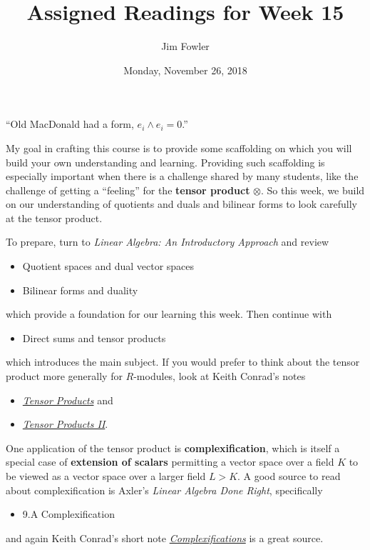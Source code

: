 \documentclass{homework}
\author{Jim Fowler}
\title{Assigned Readings for Week 15}
\date{Monday, November 26, 2018}
\begin{document}
\maketitle

``Old MacDonald had a form, $e_i \wedge e_i = 0$.''

My goal in crafting this course is to provide some scaffolding on
which you will build your own understanding and learning.  Providing
such scaffolding is especially important when there is a challenge
shared by many students, like the challenge of getting a ``feeling''
for the \textbf{tensor product} $\otimes$.  So this week, we build on
our understanding of quotients and duals and bilinear forms to look
carefully at the tensor product.

To prepare, turn to \textit{Linear Algebra: An Introductory Approach}
and review
\begin{itemize}
\item {} Quotient spaces and dual vector spaces
\item {} Bilinear forms and duality
\end{itemize}
which provide a foundation for our learning this week.  Then continue
with
\begin{itemize}
\item {} Direct sums and tensor products
\end{itemize}
which introduces the main subject.  If you would prefer to think about the tensor product more generally for $R$-modules, look at Keith Conrad's notes
\begin{itemize}
\item \href{http://www.math.uconn.edu/~kconrad/blurbs/linmultialg/tensorprod.pdf}{\textit{Tensor Products}} and
\item \href{http://www.math.uconn.edu/~kconrad/blurbs/linmultialg/tensorprod2.pdf}{\textit{Tensor Products II}}.
\end{itemize}

One application of the tensor product is \textbf{complexification},
which is itself a special case of \textbf{extension of scalars}
permitting a vector space over a field $K$ to be viewed as a vector
space over a larger field $L > K$.  A good source to read about
complexification is Axler's \textit{Linear Algebra Done Right},
specifically
\begin{itemize}
\item \textsection 9.A Complexification
\end{itemize}
and again Keith Conrad's short note \href{http://www.math.uconn.edu/~kconrad/blurbs/linmultialg/complexification.pdf}{\textit{Complexifications}} is a great source.
\end{document}
